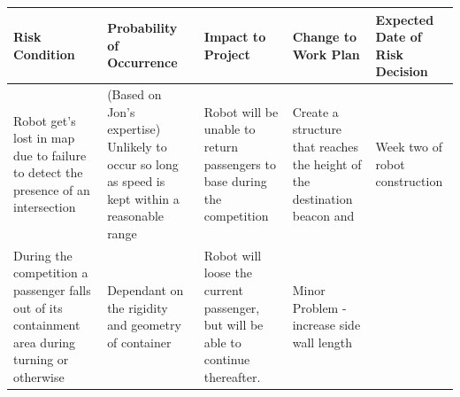 \documentclass[12pt]{article}
\begin{document}
\begin{longtable}{| L{7em} | L{7em} | L{7em} | L{7em} | L{6em} |}
\hline 
Risk Condition & Probability of Occurrence & Impact to Project & Change to Work Plan & Expected Date of Risk Decision \\
\hline
Robot get’s lost in map due to failure to detect the presence of an intersection
& (Based on Jon’s expertise) Unlikely to occur so long as speed is kept within a
reasonable range & Robot will be unable to return passengers to base during the
competition & Create a structure that reaches the height of the destination
beacon and & Week two of robot construction \\
\hline
During the competition a passenger falls out of its containment area during
turning or otherwise& Dependant on the rigidity and geometry of container &
Robot will loose the current passenger, but will be able to continue thereafter.
& Minor Problem - increase side wall length


\end{longtable}
\end{document}
